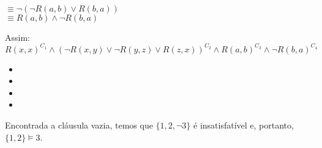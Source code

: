 \begin{rexercises}
\begin{question}
\begin{resolution}
\begin{itemize}
                \\ $\equiv \neg(\neg R(a, b) \lor R(b, a))$
                \\ $\equiv R(a, b) \land \neg R(b, a)$ 
            \end{itemize}
            Assim:
            \[R(x, x)^{C_1} \land (\neg R(x, y) \lor \neg R(y, z) \lor R(z, x))^{C_2} \land  R(a, b)^{C_3} \land \neg R(b, a)^{C_4}\]
            \begin{itemize}
                \item [] 
                \item [] 
                \item [] 
                \item [] 
            \end{itemize}
            Encontrada a cláusula vazia, temos que $\{1, 2, \neg 3\}$ é insatisfatível e, portanto, $\{1, 2\} \vDash 3$.
        \end{resolution}
    \end{question}
\end{rexercises}


